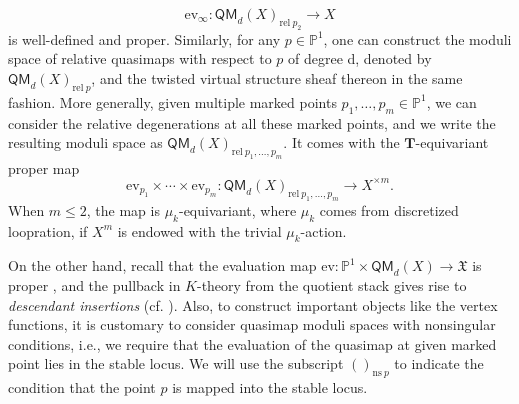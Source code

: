 \documentclass[reqno]{amsart}
\numberwithin{equation}{section}
\numberwithin{equation}{section}
\numberwithin{equation}{section}
\theoremstyle{definition}
\theoremstyle{remark}
\theoremstyle{remark}
\begin{document}
\begin{equation}
    \mathrm{ev}_{\infty}: \mathsf{QM}_d(X)_{\mathrm{rel} \  p_2} \to X
\end{equation}
is well-defined and proper. Similarly, for any $p \in \mathbb{P}^1$, one can construct the moduli space of relative quasimaps with respect to $p$ of degree d, denoted by $\mathsf{QM}_d(X)_{\mathrm{rel} \  p}$, and the twisted virtual structure sheaf thereon in the same fashion. More generally, given multiple marked points $p_1, \dots, p_m \in \mathbb{P}^1$, we can consider the relative degenerations at all these marked points, and we write the resulting moduli space as $\mathsf{QM}_d(X)_{\mathrm{rel} \  p_1,\dots, p_m}$. It comes with the $\mathbf{T}$-equivariant proper map
\begin{equation}
    \mathrm{ev}_{p_1} \times \cdots \times \mathrm{ev}_{p_m}: \mathsf{QM}_d(X)_{\mathrm{rel} \  p_1,\dots, p_m} \to X^{\times m}.
\end{equation}
When $m \leq 2$, the map is $\mu_k$-equivariant, where $\mu_k$ comes from discretized loopration,  if $X^m$ is endowed with the trivial $\mu_k$-action.

On the other hand, recall that the evaluation map $\mathrm{ev}: \mathbb{P}^1 \times \mathsf{QM}_d(X) \to \mathfrak{X}$ is proper \cite[Theorem 4.1.2]{quasi-map}, and the pullback in $K$-theory from the quotient stack gives rise to \emph{descendant insertions} (cf. \cite[Section 7]{Oko17}). Also, to construct important objects like the vertex functions, it is customary to consider quasimap moduli spaces with nonsingular conditions, i.e., we require that the evaluation of the quasimap at given marked point lies in the stable locus. We will use the subscript ${()}_{\mathrm{ns} \ p}$ to indicate the condition that the point $p$ is mapped into the stable locus.
\end{document}
